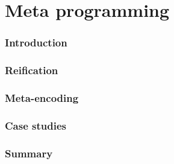 \part{Meta programming}
\section{Introduction}

\section{Reification}

\section{Meta-encoding}

\section{Case studies}





% 
% 
\section{Summary}

%
